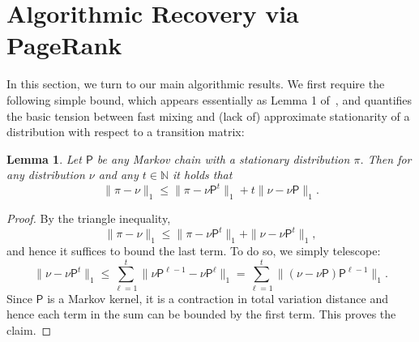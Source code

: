 \documentclass[11pt]{article}
\newtheorem{lem}[thm]{Lemma}
\theoremstyle{remark}
\begin{document}
\section{Algorithmic Recovery via PageRank}

In this section, we turn to our main algorithmic results. We first require the following simple bound, which appears essentially as Lemma 1 of~\cite{subramanian}, and quantifies the basic tension between fast mixing and (lack of) approximate stationarity of a distribution with respect to a transition matrix:
\begin{lem}
\label{lem:coupling_main}
    Let $\mathsf{P}$ be any Markov chain with a stationary distribution $\pi$. Then for any distribution $\nu$ and any $t\in \mathbb{N}$ it holds that
    \begin{equation*}
        \|\pi-\nu\|_1\leq \|\pi -\nu\mathsf{P}^t\|_1+t\|\nu-\nu\mathsf{P}\|_1.
    \end{equation*}
\end{lem}
\begin{proof}
    By the triangle inequality,
    \begin{equation*}
        \|\pi-\nu\|_1\leq \|\pi -\nu\mathsf{P}^t\|_1+\|\nu-\nu\mathsf{P}^t\|_1,
    \end{equation*}
    and hence it suffices to bound the last term. To do so, we simply telescope:
    \begin{equation*}
\|\nu-\nu\mathsf{P}^t\|_1 \leq \sum_{\ell=1}^t \|\nu\mathsf{P}^{\ell-1}-\nu \mathsf{P}^{\ell}\|_1=\sum_{\ell=1}^t \|(\nu-\nu \mathsf{P})\mathsf{P}^{\ell-1}\|_1. 
    \end{equation*}
    Since $\mathsf{P}$ is a Markov kernel, it is a contraction in total variation distance and hence each term in the sum can be bounded by the first term. This proves the claim.
\end{proof}
\end{document}
